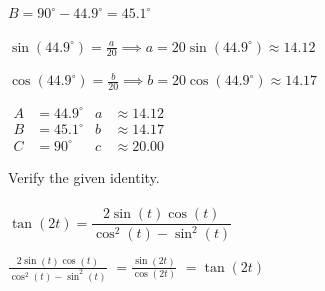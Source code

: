 \documentclass[11pt]{exam}
\begin{document}
\begin{questions}

\begin{solution}
    \(B = 90^\circ - 44.9^\circ = 45.1^\circ\)

\(\sin(44.9^\circ) = \frac{a}{20} \implies a = 20\sin(44.9^\circ) \approx 14.12\)

\(\cos(44.9^\circ) = \frac{b}{20} \implies b = 20\cos(44.9^\circ) \approx 14.17\)

\(\boxed{\begin{aligned} A &= 44.9^\circ & a &\approx 14.12 \\ B &= 45.1^\circ & b &\approx 14.17 \\ C &= 90^\circ & c &\approx 20.00 \end{aligned}}\)

\end{solution}

\newpage

\question[5]
Verify the given identity.\\ \\
\(\tan(2t) = \dfrac{2\sin(t)\cos(t)}{\cos^2(t) - \sin^2(t)}\)
    \begin{solution}
    
        \(\frac{2\sin(t)\cos(t)}{\cos^2(t) - \sin^2(t)}\)
        \(= \frac{\sin(2t)}{\cos(2t)}\)
        \(= \boxed{\tan(2t)}\)
    \end{solution}

\newpage


\end{questions}
\end{document}
